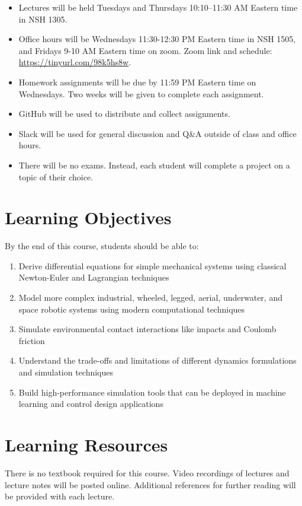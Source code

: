 \documentclass[11pt,letterpaper]{article}
\begin{document}
\begin{itemize}
	\item Lectures will be held Tuesdays and Thursdays 10:10--11:30 AM Eastern time in NSH 1305.
	\item Office hours will be Wednesdays 11:30-12:30 PM Eastern time in NSH 1505, and Fridays 9-10 AM Eastern time on zoom. Zoom link and schedule:   \url{https://tinyurl.com/98k5hs8w}.
	\item Homework assignments will be due by 11:59 PM Eastern time on Wednesdays. Two weeks will be given to complete each assignment.
	\item GitHub will be used to distribute and collect assignments.
	\item Slack will be used for general discussion and Q\&A outside of class and office hours.
	\item There will be no exams. Instead, each student will complete a project on a topic of their choice.
\end{itemize}

\section*{Learning Objectives}
By the end of this course, students should be able to:
\begin{enumerate}
	\item Derive differential equations for simple mechanical systems using classical Newton-Euler and Lagrangian techniques
	\item Model more complex industrial, wheeled, legged, aerial, underwater, and space robotic systems using modern computational techniques
	\item Simulate environmental contact interactions like impacts and Coulomb friction
	\item Understand the trade-offs and limitations of different dynamics formulations and simulation techniques
	\item Build high-performance simulation tools that can be deployed in machine learning and control design applications
	
\end{enumerate}

\section*{Learning Resources}

There is no textbook required for this course. Video recordings of lectures and lecture notes will be posted online. Additional references for further reading will be provided with each lecture.
\end{document}

